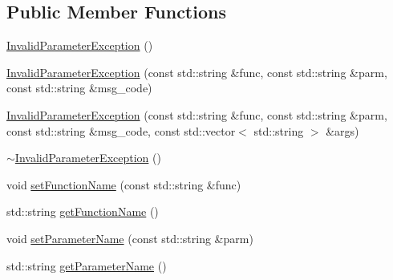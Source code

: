 \subsection*{Public Member Functions}
\begin{DoxyCompactItemize}
\item 
\hyperlink{classopen_mind_1_1exception_1_1_invalid_parameter_exception_a9b5431fbb136ee8d5b6b94f21739e34f}{Invalid\+Parameter\+Exception} ()
\item 
\hyperlink{classopen_mind_1_1exception_1_1_invalid_parameter_exception_a88095be9452394871b0fda68d14c191e}{Invalid\+Parameter\+Exception} (const std\+::string \&func, const std\+::string \&parm, const std\+::string \&msg\+\_\+code)
\item 
\hyperlink{classopen_mind_1_1exception_1_1_invalid_parameter_exception_a2c8c4f50d5429973973360d6be3f13ec}{Invalid\+Parameter\+Exception} (const std\+::string \&func, const std\+::string \&parm, const std\+::string \&msg\+\_\+code, const std\+::vector$<$ std\+::string $>$ \&args)
\item 
\hyperlink{classopen_mind_1_1exception_1_1_invalid_parameter_exception_a66b9d92bfbfb8b96ee6569bd0edf79cf}{$\sim$\+Invalid\+Parameter\+Exception} ()
\item 
void \hyperlink{classopen_mind_1_1exception_1_1_invalid_parameter_exception_afeb86e17503c1f4ebd9bd5656301c577}{set\+Function\+Name} (const std\+::string \&func)
\item 
std\+::string \hyperlink{classopen_mind_1_1exception_1_1_invalid_parameter_exception_ad49e479deb178903219421d4e0652946}{get\+Function\+Name} ()
\item 
void \hyperlink{classopen_mind_1_1exception_1_1_invalid_parameter_exception_a612fa2bcfda69a99349031239d0c0d3f}{set\+Parameter\+Name} (const std\+::string \&parm)
\item 
std\+::string \hyperlink{classopen_mind_1_1exception_1_1_invalid_parameter_exception_a740877d4a9dc2450aab0a36e5c89fa8f}{get\+Parameter\+Name} ()
\end{DoxyCompactItemize}


